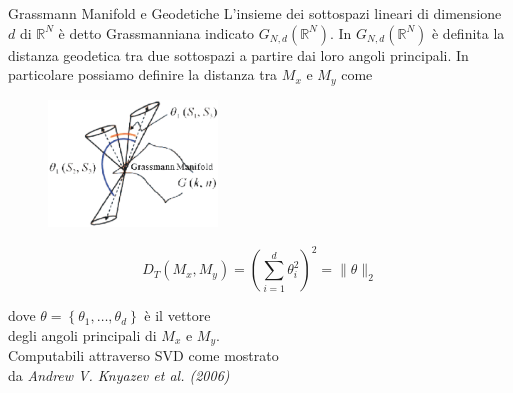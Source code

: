 \documentclass[usenames,dvipsnames,9pt]{beamer}
\newcommand{\RR}{\mathbb{R}}
\theoremstyle{definition}
\begin{document}
\begin{frame}{Grassmann Manifold e Geodetiche}
L'insieme dei sottospazi lineari di dimensione $d$ di $\RR^{N}$ è detto Grassmanniana indicato $G_{N,d}(\RR^{N})$. In $G_{N,d}(\RR^{N})$ è definita la distanza geodetica tra due sottospazi a partire dai loro angoli principali. In particolare possiamo definire la distanza tra $M_x$ e $M_y$ come

\begin{figure}
    \centering
    \includegraphics[width=0.4\textwidth]{graphics/principalangles.eps}
\end{figure}

\begin{equation*}
	D_{T}\left(M_{x}, M_{y}\right)=\left(\sum_{i=1}^{d} \theta_{i}^{2}\right)^{2}=\|\theta\|_{2}
\end{equation*}

dove $\theta=\left\{\theta_{1}, \ldots, \theta_{d}\right\}$ è il vettore \\ degli angoli principali di $M_x$ e $M_y$. \\
Computabili attraverso SVD come mostrato \\
da \textit{Andrew V. Knyazev et al. (2006)}
\end{frame}
\end{document}

